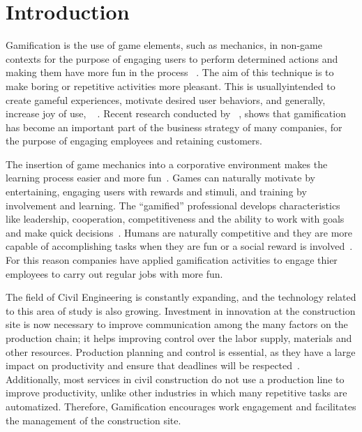 \section{Introduction}
\label{introduction}

Gamification is the use of game elements, such as mechanics, in non-game contexts for the purpose of engaging users to perform determined actions and making them have more fun in the process ~\cite{2212883,Huotari,Zich}. The aim of this technique is to make boring or repetitive activities more pleasant. This is usuallyintended to create gameful experiences, motivate desired user behaviors, and generally, increase joy of use, ~\cite{2212883,Huotari} . Recent research conducted by  ~\cite{Gartner}, shows that gamification has become an important part of the business strategy of many companies, for the purpose of engaging employees and retaining customers.

The insertion of game mechanics into a corporative environment makes the learning process easier and more fun~\cite {Medina}. Games can naturally motivate by entertaining, engaging users with rewards and stimuli, and training by involvement and learning. The ``gamified'' professional develops characteristics like leadership, cooperation, competitiveness and the ability to work with goals and make quick decisions~\cite{Zich}. Humans are naturally competitive and they are more capable of accomplishing tasks when they are fun or a social reward is involved~\cite{Medina}. For this reason companies have applied gamification activities to engage thier employees to carry out regular jobs with more fun.

The field of Civil Engineering is constantly expanding, and the technology related to this area of study is also growing. Investment in innovation at the construction site is now necessary to improve communication among the many factors on the production chain; it helps improving control over the labor supply, materials and other resources. Production planning and control is essential, as they have a large impact on productivity and ensure that deadlines will be respected~\cite{formoso}. Additionally, most services in civil construction do not use a production line to improve productivity, unlike other industries in which many repetitive tasks are automatized. Therefore, Gamification encourages work engagement and facilitates the management of the construction site. 


